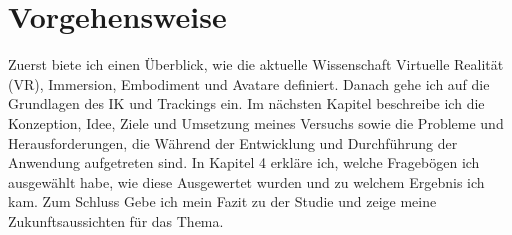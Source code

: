 \section{Vorgehensweise}
Zuerst biete ich einen Überblick, wie die aktuelle Wissenschaft Virtuelle Realität (VR), Immersion, Embodiment und Avatare definiert. Danach gehe ich auf die Grundlagen des IK und Trackings ein. Im nächsten Kapitel beschreibe ich die Konzeption, Idee, Ziele und Umsetzung meines Versuchs sowie die Probleme und Herausforderungen, die Während der Entwicklung und Durchführung der Anwendung aufgetreten sind. In Kapitel 4 erkläre ich, welche Fragebögen ich ausgewählt habe, wie diese Ausgewertet wurden und zu welchem Ergebnis ich kam. Zum Schluss Gebe ich mein Fazit zu der Studie und zeige meine Zukunftsaussichten für das Thema.